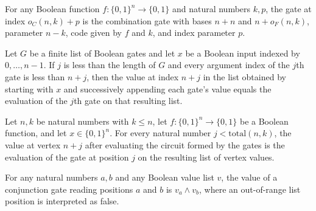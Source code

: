 \begin{theorem}
\label{BoolCircuit.Lupanov.gateAt_c}
\leanok
{}
For any Boolean function $f:\{0,1\}^n\to\{0,1\}$ and natural numbers $k,p$, the gate at
index $o_C(n,k)+p$ is the combination gate with bases $n+n$ and $n+o_F(n,k)$, parameter
$n-k$, code given by $f$ and $k$, and index parameter $p$.
\end{theorem}

\begin{theorem}
\label{BoolCircuit.Lupanov.vertexValue_gate}
\leanok
{}
Let $G$ be a finite list of Boolean gates and let $x$ be a Boolean input indexed by
$0,\ldots,n-1$. If $j$ is less than the length of $G$ and every argument index of the
$j$th gate is less than $n+j$, then the value at index $n+j$ in the list obtained by
starting with $x$ and successively appending each gate’s value equals the evaluation of
the $j$th gate on that resulting list.
\end{theorem}

\begin{theorem}
\label{BoolCircuit.Lupanov.value_gateAt}
\leanok
{}
Let $n,k$ be natural numbers with $k\le n$, let $f:\{0,1\}^n\to\{0,1\}$ be a Boolean
function, and let $x\in\{0,1\}^n$. For every natural number $j<\mathrm{total}(n,k)$, the
value at vertex $n+j$ after evaluating the circuit formed by the gates is the evaluation
of the gate at position $j$ on the resulting list of vertex values.
\end{theorem}

\begin{theorem}
\label{BoolCircuit.Lupanov.eval_and_pair}
\leanok
{}
For any natural numbers $a,b$ and any Boolean value list $v$, the value of a conjunction
gate reading positions $a$ and $b$ is $v_a\land v_b$, where an out-of-range list
position is interpreted as false.
\end{theorem}

